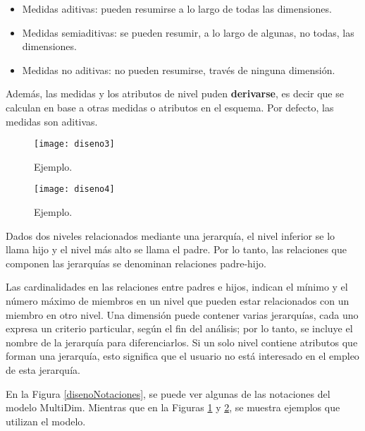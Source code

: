\documentclass[a4paper,11pt]{article}
\begin{document}
\begin{itemize}
\begin{itemize}
          \item Medidas aditivas: pueden resumirse a lo largo de todas las dimensiones.
          \item Medidas semiaditivas: se pueden resumir, a lo largo de algunas, no todas, las dimensiones.
          \item Medidas no aditivas: no pueden resumirse, través de ninguna dimensión.
        \end{itemize}
        Además, las medidas y los atributos de nivel puden \textbf{derivarse}, es decir que se calculan en base a otras medidas o atributos en el esquema.
        Por defecto, las medidas son aditivas.
      \end{itemize}
      
      \begin{figure}
        \begin{center}
          \texttt{[image: diseno3]}
          \caption{Ejemplo.}
          \label{disenoEj1}
        \end{center}
      \end{figure}
      
      \begin{figure}
        \begin{center}
          \texttt{[image: diseno4]}
          \caption{Ejemplo.}
          \label{disenoEj2}
        \end{center}
      \end{figure}
    
      Dados dos niveles relacionados mediante una jerarquía, el nivel inferior se lo llama hijo y el nivel más alto se llama el padre.
      Por lo tanto, las relaciones que componen las jerarquías se denominan relaciones padre-hijo.
      
      Las cardinalidades en las relaciones entre padres e hijos, indican el mínimo y el número máximo de miembros en un nivel que pueden estar relacionados
      con un miembro en otro nivel.
      Una dimensión puede contener varias jerarquías, cada uno expresa un criterio particular, según el fin del análisis; por lo tanto, se incluye el nombre
      de la jerarquía para diferenciarlos. Si un solo nivel contiene atributos que forman una jerarquía, esto significa que el usuario no está interesado
      en el empleo de esta jerarquía.
      
      En la Figura \ref{disenoNotaciones}, se puede ver algunas de las notaciones del modelo MultiDim. Mientras que en la Figuras \ref{disenoEj1} y \ref{disenoEj2},
      se muestra ejemplos que utilizan el modelo.
      
\end{document}
